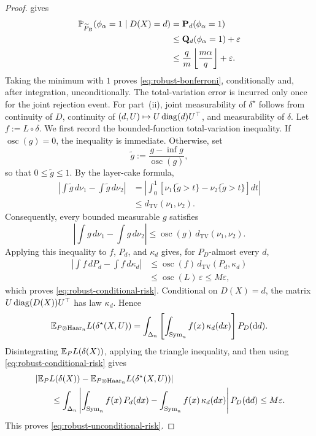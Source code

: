 \begin{proof}
gives
\[
\begin{aligned}
\mathbb{P}_{\widetilde P_B}(\phi_\alpha=1\mid D(X)=d)
&=
\mathbf P_d(\phi_\alpha=1) \\
&\leq
\mathbf Q_d(\phi_\alpha=1)+\varepsilon \\
&\leq
\frac{q}{m}
\left\lfloor\frac{m\alpha}{q}\right\rfloor+\varepsilon.
\end{aligned}
\]
Taking the minimum with \(1\) proves
\eqref{eq:robust-bonferroni}, conditionally and, after integration,
unconditionally. The total-variation error is incurred only once for
the joint rejection event.
For part~\textup{(ii)}, joint measurability of \(\delta^\star\)
follows from continuity of \(D\), continuity of
\((d,U)\mapsto U\operatorname{diag}(d)U^\top\), and measurability of \(\delta\).
Let \(f:=L\circ\delta\). We first record the bounded-function
total-variation inequality. If \(\operatorname{osc}(g)=0\), the
inequality is immediate. Otherwise, set
\[
\widetilde g
:=
\frac{g-\inf g}{\operatorname{osc}(g)},
\]
so that \(0\leq\widetilde g\leq1\). By the layer-cake formula,
\[
\begin{aligned}
\left|
\int\widetilde g\,d\nu_1-\int\widetilde g\,d\nu_2
\right|
&=
\left|
\int_0^1
\left[
\nu_1\{\widetilde g>t\}
-
\nu_2\{\widetilde g>t\}
\right]dt
\right| \\
&\leq
d_{\mathrm{TV}}(\nu_1,\nu_2).
\end{aligned}
\]
Consequently, every bounded measurable \(g\) satisfies
\[
\left|
\int g\,d\nu_1-\int g\,d\nu_2
\right|
\leq
\operatorname{osc}(g)\,
d_{\mathrm{TV}}(\nu_1,\nu_2).
\]
Applying this inequality to \(f\), \(P_d\), and \(\kappa_d\) gives,
for \(P_D\)-almost every \(d\),
\[
\begin{aligned}
\left|
\int f\,dP_d-\int f\,d\kappa_d
\right|
&\leq
\operatorname{osc}(f)\,
d_{\mathrm{TV}}(P_d,\kappa_d) \\
&\leq
\operatorname{osc}(L)\,\varepsilon
\leq M\varepsilon,
\end{aligned}
\]
which proves \eqref{eq:robust-conditional-risk}.
Conditional on \(D(X)=d\), the matrix
\(U\operatorname{diag}(D(X))U^\top\) has law \(\kappa_d\). Hence
\[
\mathbb{E}_{P\otimes\mathrm{Haar}_n}L(\delta^\star(X,U))
=
\int_{\Delta_n}
\left[
\int_{\mathrm{Sym}_n}f(x)\,\kappa_d(dx)
\right]P_D(\mathrm{d}d).
\]
Disintegrating \(\mathbb{E}_P L(\delta(X))\), applying the triangle
inequality, and then using \eqref{eq:robust-conditional-risk} gives
\[
\begin{aligned}
&
\left|
\mathbb{E}_P L(\delta(X))
-
\mathbb{E}_{P\otimes\mathrm{Haar}_n}L(\delta^\star(X,U))
\right| \\
&\qquad\leq
\int_{\Delta_n}
\left|
\int_{\mathrm{Sym}_n}f(x)\,P_d(dx)
-
\int_{\mathrm{Sym}_n}f(x)\,\kappa_d(dx)
\right|P_D(\mathrm{d}d)
\leq M\varepsilon.
\end{aligned}
\]
This proves \eqref{eq:robust-unconditional-risk}.
\end{proof}

